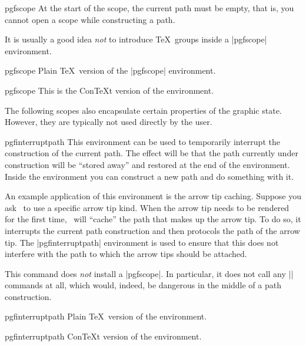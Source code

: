 \begin{environment}{{pgfscope}}
  At the start of the scope, the current path must be empty, that is,
  you cannot open a scope while constructing a path.

  It is usually a good idea \emph{not} to introduce \TeX\ groups
  inside a |{pgfscope}| environment.
\end{environment}

\begin{plainenvironment}{{pgfscope}}
  Plain \TeX\ version of the |{pgfscope}| environment.
\end{plainenvironment}

\begin{contextenvironment}{{pgfscope}}
  This is the Con\TeX t version of the environment.
\end{contextenvironment}


The following scopes also encapsulate certain properties of the
graphic state. However, they are typically not used directly by the
user.

\begin{environment}{{pgfinterruptpath}}
  This environment can be used to temporarily interrupt the
  construction of the current path. The effect will be that the path
  currently under construction will be ``stored away'' and restored at
  the end of the environment. Inside the environment you can construct
  a new path and do something with it.

  An example application of this environment is the arrow tip
  caching. Suppose you ask \pgfname\ to use a specific arrow tip
  kind. When the arrow tip needs to be rendered for the first time,
  \pgfname\ will ``cache'' the path that makes up the arrow tip. To do
  so, it interrupts the current path construction and then protocols
  the path of the arrow tip. The |{pgfinterruptpath}| environment is
  used to ensure that this does not interfere with the path to which
  the arrow tips should be attached.

  This command does \emph{not} install a |{pgfscope}|. In particular,
  it does not call any |\pgfsys@| commands at all, which would,
  indeed, be dangerous in the middle of a path construction.
\end{environment}

\begin{plainenvironment}{{pgfinterruptpath}}
  Plain \TeX\ version of the environment.
\end{plainenvironment}

\begin{contextenvironment}{{pgfinterruptpath}}
  Con\TeX t version of the environment.
\end{contextenvironment}


